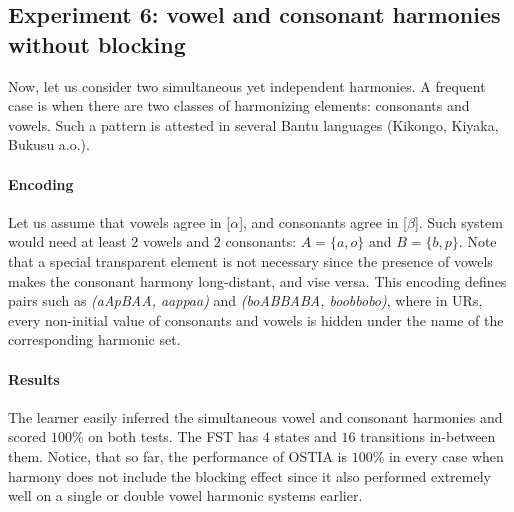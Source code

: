 \subsection{Experiment 6: vowel and consonant harmonies without blocking}

Now, let us consider two simultaneous yet independent harmonies.
A frequent case is when there are two classes of harmonizing elements: consonants and vowels.
Such a pattern is attested in several Bantu languages (Kikongo, Kiyaka, Bukusu a.o.).


\paragraph{Encoding}
Let us assume that vowels agree in [$\alpha$], and consonants agree in [$\beta$].
Such system would need at least $2$ vowels and $2$ consonants: $A = \{a, o\}$ and $B = \{b, p\}$.
Note that a special transparent element is not necessary since the presence of vowels makes the consonant harmony long-distant, and vise versa.
This encoding defines pairs such as \emph{(aApBAA, aappaa)} and \emph{(boABBABA, boobbobo)}, where in URs, every non-initial value of consonants and vowels is hidden under the name of the corresponding harmonic set.


\paragraph{Results}

The learner easily inferred the simultaneous vowel and consonant harmonies and scored $100$\% on both tests.
The FST has $4$ states and $16$ transitions in-between them.
Notice, that so far, the performance of OSTIA is $100$\% in every case when harmony does not include the blocking effect since it also performed extremely well on a single or double vowel harmonic systems earlier.


